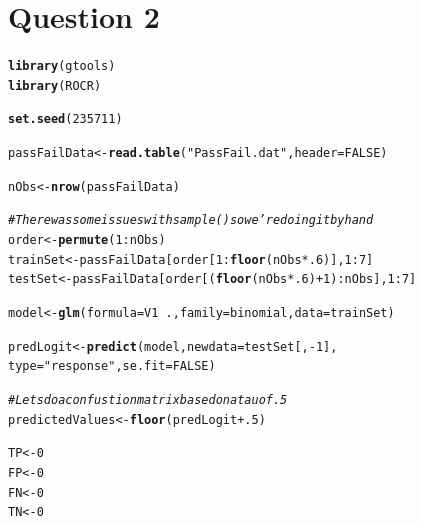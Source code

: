 \documentclass[11pt]{article}\usepackage[]{graphicx}\usepackage[]{color}
\makeatletter
\newcommand{\hlnum}[1]{\textcolor[rgb]{0.686,0.059,0.569}{#1}}%
\newcommand{\hlstr}[1]{\textcolor[rgb]{0.192,0.494,0.8}{#1}}%
\newcommand{\hlcom}[1]{\textcolor[rgb]{0.678,0.584,0.686}{\textit{#1}}}%
\newcommand{\hlopt}[1]{\textcolor[rgb]{0,0,0}{#1}}%
\newcommand{\hlstd}[1]{\textcolor[rgb]{0.345,0.345,0.345}{#1}}%
\newcommand{\hlkwb}[1]{\textcolor[rgb]{0.69,0.353,0.396}{#1}}%
\newcommand{\hlkwc}[1]{\textcolor[rgb]{0.333,0.667,0.333}{#1}}%
\newcommand{\hlkwd}[1]{\textcolor[rgb]{0.737,0.353,0.396}{\textbf{#1}}}%
\newenvironment{kframe}{%
 \def\at@end@of@kframe{}%
 \ifinner\ifhmode%
  \def\at@end@of@kframe{\end{minipage}}%
  \begin{minipage}{\columnwidth}%
 \fi\fi%
 \def\FrameCommand##1{\hskip\@totalleftmargin \hskip-\fboxsep
 \colorbox{shadecolor}{##1}\hskip-\fboxsep
     \hskip-\linewidth \hskip-\@totalleftmargin \hskip\columnwidth}%
 \MakeFramed {\advance\hsize-\width
   \@totalleftmargin\z@ \linewidth\hsize
   \@setminipage}}%
 {\par\unskip\endMakeFramed%
 \at@end@of@kframe}
\newenvironment{knitrout}{}{} %
\makeatother
\begin{document}
\section{Question 2}
\label{sec-2}
\begin{knitrout}
\color{fgcolor}\begin{kframe}
\begin{alltt}
\hlkwd{library}\hlstd{( gtools )}
\hlkwd{library}\hlstd{( ROCR )}

\hlkwd{set.seed}\hlstd{(} \hlnum{235711} \hlstd{)}

\hlstd{passFailData} \hlkwb{<-} \hlkwd{read.table}\hlstd{(} \hlstr{"PassFail.dat"}\hlstd{,} \hlkwc{header}\hlstd{=}\hlnum{FALSE} \hlstd{)}

\hlstd{nObs} \hlkwb{<-} \hlkwd{nrow}\hlstd{( passFailData )}

\hlcom{#There was some issues with sample() so we're doing it by hand}
\hlstd{order} \hlkwb{<-} \hlkwd{permute}\hlstd{(} \hlnum{1}\hlopt{:}\hlstd{nObs )}
\hlstd{trainSet} \hlkwb{<-} \hlstd{passFailData[order[}\hlnum{1}\hlopt{:}\hlkwd{floor}\hlstd{(nObs}\hlopt{*}\hlnum{.6}\hlstd{)],}\hlnum{1}\hlopt{:}\hlnum{7}\hlstd{]}
\hlstd{testSet} \hlkwb{<-} \hlstd{passFailData[order[(}\hlkwd{floor}\hlstd{(nObs}\hlopt{*}\hlnum{.6}\hlstd{)}\hlopt{+}\hlnum{1}\hlstd{)}\hlopt{:}\hlstd{nObs],}\hlnum{1}\hlopt{:}\hlnum{7}\hlstd{]}

\hlstd{model} \hlkwb{<-} \hlkwd{glm}\hlstd{(} \hlkwc{formula} \hlstd{= V1} \hlopt{~} \hlstd{.,} \hlkwc{family}\hlstd{=binomial,} \hlkwc{data}\hlstd{=trainSet )}

\hlstd{predLogit} \hlkwb{<-} \hlkwd{predict}\hlstd{( model ,} \hlkwc{newdata}\hlstd{=testSet[,}\hlopt{-}\hlnum{1}\hlstd{],}
                     \hlkwc{type}\hlstd{=}\hlstr{"response"}\hlstd{,} \hlkwc{se.fit} \hlstd{=} \hlnum{FALSE} \hlstd{)}

\hlcom{#Lets do a confustion matrix based on a tau of .5}
\hlstd{predictedValues} \hlkwb{<-} \hlkwd{floor}\hlstd{( predLogit} \hlopt{+} \hlnum{.5} \hlstd{)}

\hlstd{TP} \hlkwb{<-} \hlnum{0}
\hlstd{FP} \hlkwb{<-} \hlnum{0}
\hlstd{FN} \hlkwb{<-} \hlnum{0}
\hlstd{TN} \hlkwb{<-} \hlnum{0}


\end{alltt}
\end{kframe}
\end{knitrout}
\end{document}
